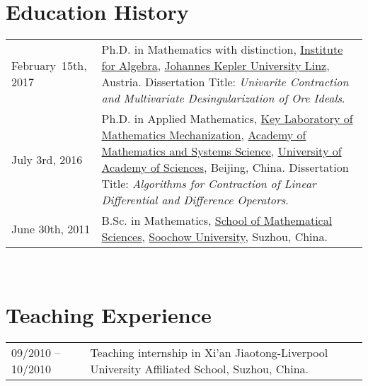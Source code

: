 \documentclass[a4paper,12pt]{article}
\begin{document}

\section*{\Large{Education History}}
\begin{tabular}{@{}p{1.5in}p{4in}}
February~15th, 2017   &  Ph.D. in Mathematics with distinction, 
                        \href{http://www.jku.at/algebra/content}{Institute for Algebra}, 
                        \href{http://www.jku.at/content}{Johannes Kepler University Linz}, Austria. 
                       Dissertation Title: {\em Univarite Contraction and Multivariate Desingularization of Ore Ideals}. \\
July 3rd, 2016    & Ph.D. in Applied Mathematics, 
                        \href{http://english.mmrc.amss.cas.cn/}{Key Laboratory of Mathematics Mechanization}, 
                        \href{http://english.amss.cas.cn/}{Academy of Mathematics and Systems Science}, 
                        \href{http://english.ucas.ac.cn/}{University of Academy of Sciences}, Beijing, China. 
                       Dissertation Title: {\em Algorithms for Contraction of  Linear Differential and Difference Operators}. \\
June 30th, 2011    & B.Sc. in Mathematics, \href{http://math.suda.edu.cn/}{School of Mathematical Sciences}, 
                        \href{http://eng.suda.edu.cn/}{Soochow University}, Suzhou, China.  
\end{tabular} \\


\section*{\Large{Teaching Experience}}
\begin{tabular}{@{}p{1.4in}p{4in}}
09/2010 -- 10/2010 & Teaching internship in Xi'an Jiaotong-Liverpool University Affiliated School, Suzhou, China. 
\end{tabular}
\end{document}
